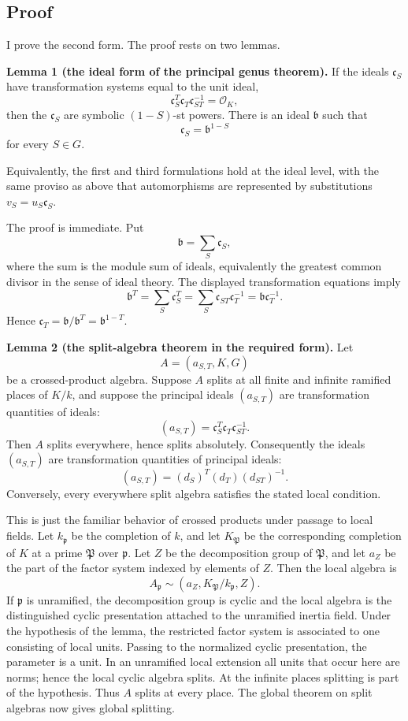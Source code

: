 \documentclass[11pt]{article}
\begin{document}
\subsection{Proof}

I prove the second form. The proof rests on two lemmas.

\textbf{Lemma 1 (the ideal form of the principal genus theorem).} If the ideals \(\mathfrak c_S\) have transformation systems equal to the unit ideal,
\[
  \mathfrak c_S^T\mathfrak c_T\mathfrak c_{ST}^{-1}=\mathcal O_K,
\]
then the \(\mathfrak c_S\) are symbolic \((1-S)\)-st powers. There is an ideal \(\mathfrak b\) such that
\[
  \mathfrak c_S=\mathfrak b^{1-S}
\]
for every \(S\in G\).

Equivalently, the first and third formulations hold at the ideal level, with the same proviso as above that automorphisms are represented by substitutions \(v_S=u_S\mathfrak c_S\).

The proof is immediate. Put
\[
  \mathfrak b=\sum_S \mathfrak c_S,
\]
where the sum is the module sum of ideals, equivalently the greatest common divisor in the sense of ideal theory. The displayed transformation equations imply
\[
  \mathfrak b^T=\sum_S \mathfrak c_S^T=\sum_S \mathfrak c_{ST}\mathfrak c_T^{-1}=\mathfrak b\mathfrak c_T^{-1}.
\]
Hence \(\mathfrak c_T=\mathfrak b/\mathfrak b^T=\mathfrak b^{1-T}\).

\textbf{Lemma 2 (the split-algebra theorem in the required form).} Let
\[
  A=(a_{S,T},K,G)
\]
be a crossed-product algebra. Suppose \(A\) splits at all finite and infinite ramified places of \(K/k\), and suppose the principal ideals \((a_{S,T})\) are transformation quantities of ideals:
\[
  (a_{S,T})=\mathfrak c_S^T\mathfrak c_T\mathfrak c_{ST}^{-1}.
\]
Then \(A\) splits everywhere, hence splits absolutely. Consequently the ideals \((a_{S,T})\) are transformation quantities of principal ideals:
\[
  (a_{S,T})=(d_S)^T(d_T)(d_{ST})^{-1}.
\]
Conversely, every everywhere split algebra satisfies the stated local condition.

This is just the familiar behavior of crossed products under passage to local fields. Let \(k_{\mathfrak p}\) be the completion of \(k\), and let \(K_{\mathfrak P}\) be the corresponding completion of \(K\) at a prime \(\mathfrak P\) over \(\mathfrak p\). Let \(Z\) be the decomposition group of \(\mathfrak P\), and let \(a_Z\) be the part of the factor system indexed by elements of \(Z\). Then the local algebra is
\[
  A_{\mathfrak p}\sim (a_Z,K_{\mathfrak P}/k_{\mathfrak p},Z).
\]
If \(\mathfrak p\) is unramified, the decomposition group is cyclic and the local algebra is the distinguished cyclic presentation attached to the unramified inertia field. Under the hypothesis of the lemma, the restricted factor system is associated to one consisting of local units. Passing to the normalized cyclic presentation, the parameter is a unit. In an unramified local extension all units that occur here are norms; hence the local cyclic algebra splits. At the infinite places splitting is part of the hypothesis. Thus \(A\) splits at every place. The global theorem on split algebras now gives global splitting.
\end{document}
